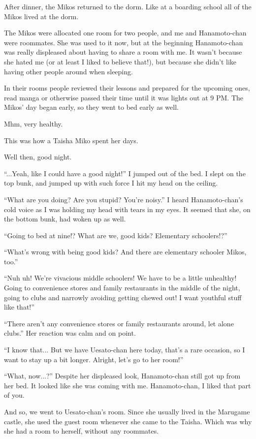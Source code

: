 After dinner, the Mikos returned to the dorm. Like at a boarding school all of the Mikos lived at the dorm.

The Mikos were allocated one room for two people, and me and Hanamoto-chan were roommates. She was used to it now, but at the beginning Hanamoto-chan was really displeased about having to share a room with me. It wasn't because she hated me (or at least I liked to believe that!), but because she didn't like having other people around when sleeping.

In their rooms people reviewed their lessons and prepared for the upcoming ones, read manga or otherwise passed their time until it was lights out at 9 PM. The Mikos' day began early, so they went to bed early as well.

Mhm, very healthy.

This was how a Taisha Miko spent her days.

Well then, good night.

``...Yeah, like I could have a good night!''  I jumped out of the bed. I slept on the top bunk, and jumped up with such force I hit my head on the ceiling.

``What are you doing? Are you stupid? You're noisy.''  I heard Hanamoto-chan's cold voice as I was holding my head with tears in my eyes. It seemed that she, on the bottom bunk, had woken up as well.

``Going to bed at nine!? What are we, good kids? Elementary schoolers!?''

``What's wrong with being good kids? And there are elementary schooler Mikos, too.''

``Nuh uh! We're vivacious middle schoolers! We have to be a little unhealthy! Going to convenience stores and family restaurants in the middle of the night, going to clubs and narrowly avoiding getting chewed out! I want youthful stuff like that!''

``There aren't any convenience stores or family restaurants around, let alone clubs.''  Her reaction was calm and on point.

``I know that... But we have Uesato-chan here today, that's a rare occasion, so I want to stay up a bit longer. Alright, let's go to her room!''

``What, now...?''  Despite her displeased look, Hanamoto-chan still got up from her bed. It looked like she was coming with me. Hanamoto-chan, I liked that part of you.

And so, we went to Uesato-chan's room. Since she usually lived in the Marugame castle, she used the guest room whenever she came to the Taisha. Which was why she had a room to herself, without any roommates.

